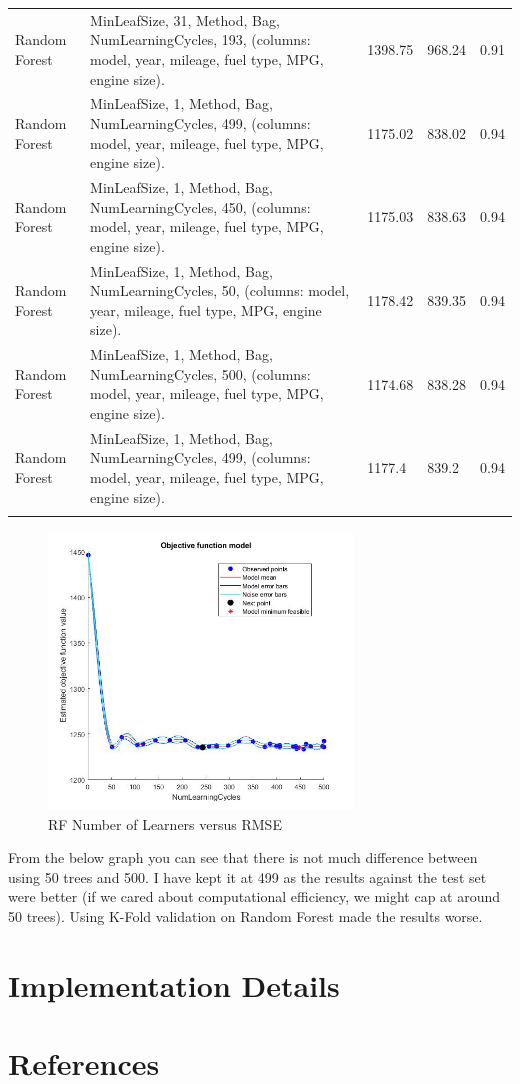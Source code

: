 \documentclass[a4paper,11pt]{article}
\begin{document}
\begin{longtable}{m{3.5cm}m{6.5cm}m{1.5cm}m{1.5cm}m{1.5cm}}
Random Forest & MinLeafSize, 31, Method, Bag, NumLearningCycles, 193, (columns: model, year, mileage, fuel type, MPG, engine size). & 1398.75 & 968.24 & 0.91 \\
\addlinespace
Random Forest & MinLeafSize, 1, Method, Bag, NumLearningCycles, 499, (columns: model, year, mileage, fuel type, MPG, engine size). & 1175.02 & 838.02 & 0.94 \\
\addlinespace
Random Forest & MinLeafSize, 1, Method, Bag, NumLearningCycles, 450, (columns: model, year, mileage, fuel type, MPG, engine size). & 1175.03 & 838.63 & 0.94 \\
\addlinespace
Random Forest & MinLeafSize, 1, Method, Bag, NumLearningCycles, 50, (columns: model, year, mileage, fuel type, MPG, engine size). & 1178.42 & 839.35 & 0.94 \\
\addlinespace
Random Forest & MinLeafSize, 1, Method, Bag, NumLearningCycles, 500, (columns: model, year, mileage, fuel type, MPG, engine size). & 1174.68 & 838.28 & 0.94 \\
\addlinespace
Random Forest & MinLeafSize, 1, Method, Bag, NumLearningCycles, 499, (columns: model, year, mileage, fuel type, MPG, engine size). & 1177.4 & 839.2 & 0.94 \\
\addlinespace
\bottomrule
\end{longtable}

\begin{figure}[!htb] %
\centering
\includegraphics[height=7.38cm]{img/RFNumLearCyclesVMinMRSE}
\caption{RF Number of Learners versus RMSE}
\end{figure}

From the below graph you can see that there is not much difference between using 50 trees and 500. I have kept it at 499 as the results against the test set were better (if we cared about computational efficiency, we might cap at around 50 trees).
Using K-Fold validation on Random Forest made the results worse.

\section{Implementation Details}

\section{References}


\end{document}
